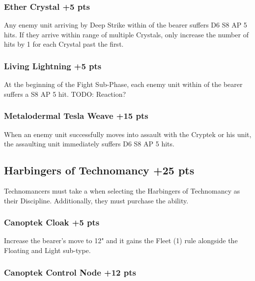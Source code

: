 \subsubsection[Ether Crystal ]{Ether Crystal  \hrulefill +5 pts}

Any enemy unit arriving by Deep Strike within  of the bearer suffers D6 S8 AP 5 hits. If they arrive within range of multiple Crystals, only increase the number of hits by 1 for each Crystal past the first.

\subsubsection[Living Lightning ]{Living Lightning  \hrulefill +5 pts}

At the beginning of the Fight Sub-Phase, each enemy unit within  of the bearer suffers a S8 AP 5 hit. TODO: Reaction?

\subsubsection[Metalodermal Tesla Weave ]{Metalodermal Tesla Weave  \hrulefill +15 pts}

When an enemy unit successfully moves into assault with the Cryptek or his unit, the assaulting unit immediately suffers D6 S8 AP 5 hits.




\subsection[Harbingers of Technomancy ]{Harbingers of Technomancy  \hrulefill +25 pts}

Technomancers must take a  when selecting the Harbingers of Technomancy as their Discipline. Additionally, they must purchase the  ability.

\subsubsection[Canoptek Cloak ]{Canoptek Cloak  \hrulefill +5 pts}

Increase the bearer's move to 12" and it gains the Fleet (1) rule alongside the Floating and Light sub-type.

\subsubsection[Canoptek Control Node ]{Canoptek Control Node  \hrulefill +12 pts}

